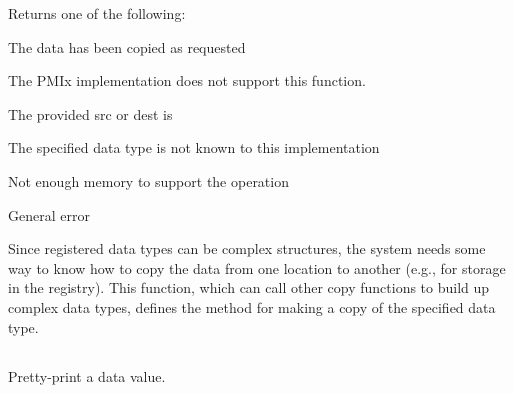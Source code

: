 \format


\begin{arglist}
\end{arglist}

Returns one of the following:
\begin{constantdesc}
\item {} The data has been copied as requested
\item {} The \ac{PMIx} implementation does not support this function.
\item {} The provided src or dest is 
\item {} The specified data type is not known to this implementation
\item {} Not enough memory to support the operation
\item {} General error
\end{constantdesc}

\descr

Since registered data types can be complex structures, the system needs some way to know how to copy the data from one location to another (e.g., for storage in the registry). This function, which can call other copy functions to build up complex data types, defines the method for making a copy of the specified data type.


\subsection{}

\summary

Pretty-print a data value.

